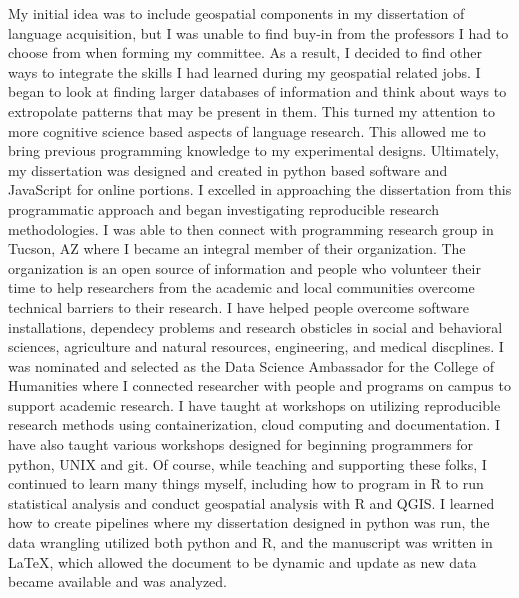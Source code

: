 \documentclass[12pt, letterpaper]{awesome-cv} %
\begin{document}
\begin{cvletter}
My initial idea was to include geospatial components in my dissertation of language acquisition, but I was unable to find buy-in from the professors I had to choose from when forming my committee. As a result, I decided to find other ways to integrate the skills I had learned during my geospatial related jobs. I began to look at finding larger databases of information and think about ways to extropolate patterns that may be present in them. This turned my attention to more cognitive science based aspects of language research. This allowed me to bring previous programming knowledge to my experimental designs. Ultimately, my dissertation was designed and created in python based software and JavaScript for online portions. I excelled in approaching the dissertation from this programmatic approach and began investigating reproducible research methodologies. I was able to then connect with programming research group in Tucson, AZ where I became an integral member of their organization. The organization is an open source of information and people who volunteer their time to help researchers from the academic and local communities overcome technical barriers to their research. I have helped people overcome software installations, dependecy problems and research obsticles in social and behavioral sciences, agriculture and natural resources, engineering, and medical discplines. I was nominated and selected as the Data Science Ambassador for the College of Humanities where I connected researcher with people and programs on campus to support academic research. I have taught at workshops on utilizing reproducible research methods using containerization, cloud computing and documentation. I have also taught various workshops designed for beginning programmers for python, UNIX and git. Of course, while teaching and supporting these folks, I continued to learn many things myself, including how to program in R to run statistical analysis and conduct geospatial analysis with R and QGIS. I learned how to create pipelines where my dissertation designed in python was run, the data wrangling utilized both python and R, and the manuscript was written in LaTeX, which allowed the document to be dynamic and update as new data became available and was analyzed. 


\end{cvletter}
\end{document}
